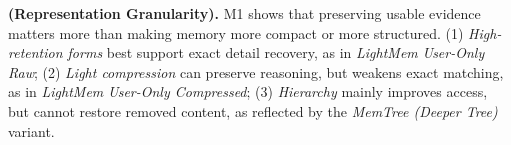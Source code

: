 \begin{findingbox}
\textbf{(Representation Granularity).}
M1 shows that preserving usable evidence matters more than making memory more compact or more structured.
(1) \emph{High-retention forms} best support exact detail recovery, as in \textit{LightMem} \textit{User-Only Raw}; (2) \emph{Light compression} can preserve reasoning, but weakens exact matching, as in \textit{LightMem} \textit{User-Only Compressed}; (3) \emph{Hierarchy} mainly improves access, but cannot restore removed content, as reflected by the \textit{MemTree (Deeper Tree)} variant.
\end{findingbox}




